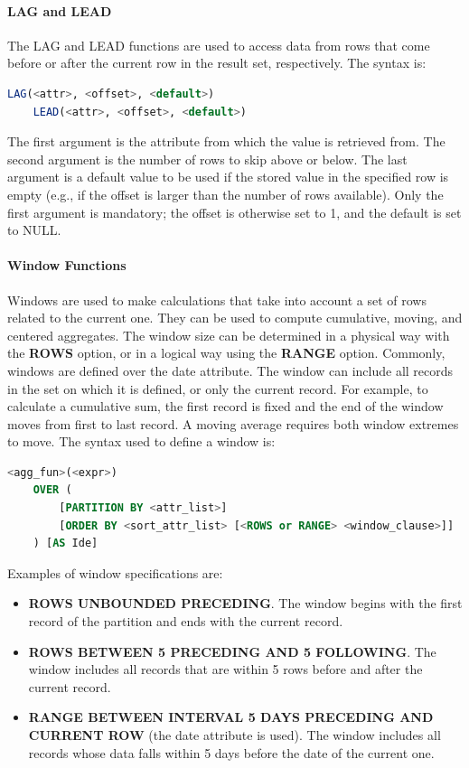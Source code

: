 \paragraph{LAG and LEAD} The LAG and LEAD functions are used to access data from rows that come before or after the current row in the result set, respectively. The syntax is:
\begin{lstlisting}[language=SQL]
    LAG(<attr>, <offset>, <default>)
    LEAD(<attr>, <offset>, <default>)
\end{lstlisting}
The first argument is the attribute from which the value is retrieved from. The second argument is the number of rows to skip above or below. The last argument is a default value to be used if the stored value in the specified row is empty (e.g., if the offset is larger than the number of rows available). Only the first argument is mandatory; the offset is otherwise set to 1, and the default is set to NULL.

\paragraph{Window Functions} Windows are used to make calculations that take into account a set of rows related to the current one. They can be used to compute cumulative, moving, and centered aggregates. The window size can be determined in a physical way with the \textbf{ROWS} option, or in a logical way using the \textbf{RANGE} option. Commonly, windows are defined over the date attribute. The window can include all records in the set on which it is defined, or only the current record. For example, to calculate a cumulative sum, the first record is fixed and the end of the window moves from first to last record. A moving average requires both window extremes to move. The syntax used to define a window is:
\begin{lstlisting}[language=SQL]
    <agg_fun>(<expr>)
    OVER (
        [PARTITION BY <attr_list>]
        [ORDER BY <sort_attr_list> [<ROWS or RANGE> <window_clause>]]
    ) [AS Ide]
\end{lstlisting}
Examples of window specifications are:
\begin{itemize}
    \item \textbf{ROWS UNBOUNDED PRECEDING}. The window begins with the first record of the partition and ends with the current record.
    \item \textbf{ROWS BETWEEN 5 PRECEDING AND 5 FOLLOWING}. The window includes all records that are within 5 rows before and after the current record.
    \item \textbf{RANGE BETWEEN INTERVAL 5 DAYS PRECEDING AND CURRENT ROW} (the date attribute is used). The window includes all records whose data falls within 5 days before the date of the current one.
\end{itemize}
